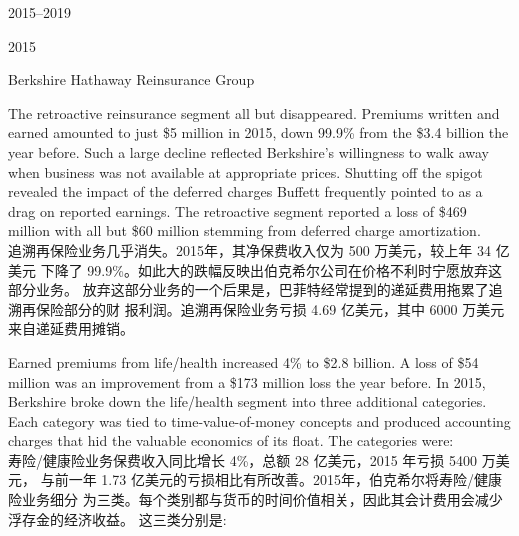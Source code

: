 \begin{chapter}{2015--2019}
\begin{section}{2015}
\begin{subsection}{Berkshire Hathaway Reinsurance Group}
\begin{verseparallel}
  {
    The retroactive reinsurance segment all but disappeared. Premiums written
    and earned amounted to just \$5 million in 2015, down 99.9\% from the \$3.4
    billion the year before. Such a large decline reflected Berkshire's
    willingness to walk away when business was not available at appropriate
    prices. Shutting off the spigot revealed the impact of the deferred charges
    Buffett frequently pointed to as a drag on reported earnings. The
    retroactive segment reported a loss of \$469 million with all but \$60
    million stemming from deferred charge amortization.  \\
  }
  {
    追溯再保险业务几乎消失。2015年，其净保费收入仅为 500 万美元，较上年 34 亿美元
    下降了 99.9\%。如此大的跌幅反映出伯克希尔公司在价格不利时宁愿放弃这部分业务。
    放弃这部分业务的一个后果是，巴菲特经常提到的递延费用拖累了追溯再保险部分的财
    报利润。追溯再保险业务亏损 4.69 亿美元，其中 6000 万美元来自递延费用摊销。
  }
\end{verseparallel}

\begin{verseparallel}
  {
    Earned premiums from life/health increased 4\% to \$2.8 billion. A loss of
    \$54 million was an improvement from a \$173 million loss the year before.
    In 2015, Berkshire broke down the life/health segment into three additional
    categories. Each category was tied to time-value-of-money concepts and
    produced accounting charges that hid the valuable economics of its float.
    The categories were: \\
  }
  {
    寿险/健康险业务保费收入同比增长 4\%，总额 28 亿美元，2015 年亏损 5400 万美元，
    与前一年 1.73 亿美元的亏损相比有所改善。2015年，伯克希尔将寿险/健康险业务细分
    为三类。每个类别都与货币的时间价值相关，因此其会计费用会减少浮存金的经济收益。
    这三类分别是:
  }

\end{verseparallel}

{\color{green}{此处应为列表项 \\}}


\end{subsection}
\end{section}
\end{chapter}
